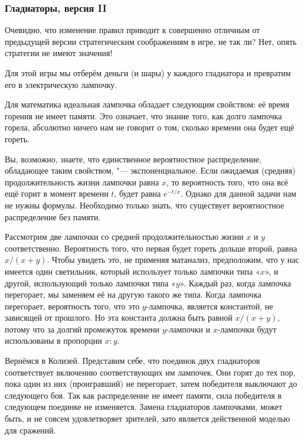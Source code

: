 \documentclass[twoside]{book}
\begin{document}
\subsubsection*{Гладиаторы, версия II}%

Очевидно, что изменение правил приводит к совершенно отличным от предыдущей версии стратегическим соображениям в игре, не так ли? Нет, опять стратегии не имеют значения!

\medskip

Для этой игры мы отберём деньги (и шары) у каждого гладиатора и превратим его
в электрическую лампочку.

Для математика идеальная лампочка обладает следующим свойством: её время горения не имеет памяти.
Это означает, что знание того, как долго лампочка горела, абсолютно ничего нам не говорит о том, сколько времени она будет ещё гореть.

Вы, возможно, знаете, что единственное вероятностное распределение, обладающее таким свойством, "--- экспоненциальное.
Если ожидаемая (средняя) продолжительность жизни лампочки равна $x$, то вероятность того, что она всё ещё горит в момент времени $t$, будет равна $e^{-t/x}$.
Однако для данной задачи нам не нужны формулы.
Необходимо только знать, что существует вероятностное распределение без памяти.

Рассмотрим две лампочки со средней продолжительностью жизни $x$ и $y$ соответственно.
Вероятность того, что первая будет гореть дольше второй, равна $x/(x+y)$.
Чтобы увидеть это, не применяя матанализ, предположим, что у нас имеется один светильник, который использует только лампочки типа «$x$», и другой, использующий только лампочки типа «$y$».
Каждый раз, когда лампочка перегорает, мы заменяем её на другую такого же типа.
Когда лампочка перегорает, вероятность того, что это $y$-лампочка, является константой, не зависящей от прошлого.
Но эта константа должна быть равной $x/(x+y)$, потому что за долгий промежуток времени $y$-лампочки и $x$-лампочки будут использованы в пропорции $x : y$.

Вернёмся в Колизей.
Представим себе, что поединок двух гладиаторов соответствует включению соответствующих им лампочек.
Они горят до тех пор, пока один из них (проигравший) не перегорает, затем победителя выключают до следующего боя.
Так как распределение не имеет памяти, сила победителя в следующем поединке не изменяется.
Замена гладиаторов лампочками, может быть, и не совсем удовлетворяет зрителей, зато является действенной моделью для сражений.
\end{document}
